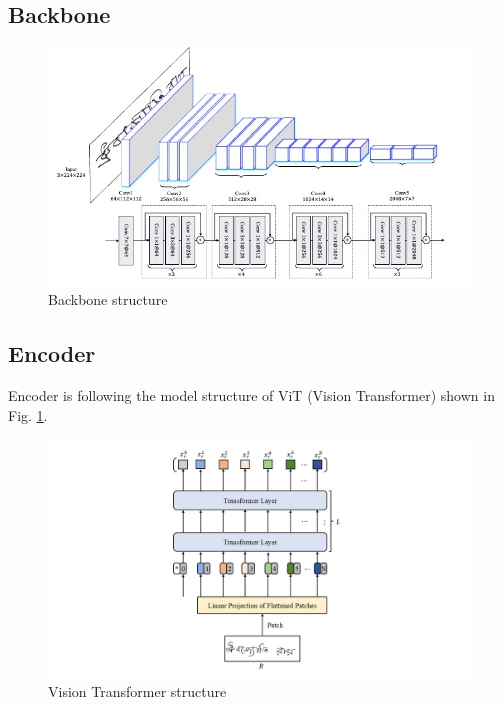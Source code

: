 \documentclass{article}
\begin{document}
\subsection{Backbone}

\begin{figure}[htbp]
	\centering
	\includegraphics[scale=0.5]{figure/p2.jpg}
	\caption{Backbone structure}\label{fig:p2}
\end{figure}

\subsection{Encoder}

Encoder is following the model structure of ViT (Vision Transformer) \cite{10} shown in Fig. \ref{fig:p2}.

\begin{figure}[htbp]
	\centering
	\includegraphics[scale=0.45]{figure/p3.jpg}
	\caption{Vision Transformer structure}\label{fig:p3}
\end{figure}
\end{document}
